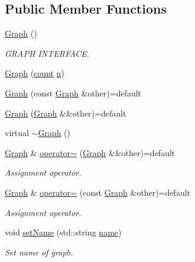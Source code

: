 \subsection*{Public Member Functions}
\begin{DoxyCompactItemize}
\item 
\hyperlink{class_networ_kit_1_1_graph_a87de501cbe5b2d6035a243e21dd6206f}{Graph} ()
\begin{DoxyCompactList}\small\item\em G\-R\-A\-P\-H I\-N\-T\-E\-R\-F\-A\-C\-E. \end{DoxyCompactList}\item 
\hyperlink{class_networ_kit_1_1_graph_aba688511045b476df066431fd797333b}{Graph} (\hyperlink{namespace_networ_kit_a76b399edfa50ae72e4aa86007aaa800a}{count} \hyperlink{class_networ_kit_1_1_graph_aae05e611d6d5eb42e045d374d73eb34a}{n})
\item 
\hyperlink{class_networ_kit_1_1_graph_a546fce4f46696bafda972708740d7c23}{Graph} (const \hyperlink{class_networ_kit_1_1_graph}{Graph} \&other)=default
\item 
\hyperlink{class_networ_kit_1_1_graph_aa6439b109da43c59f73004b95455cb98}{Graph} (\hyperlink{class_networ_kit_1_1_graph}{Graph} \&\&other)=default
\item 
virtual \hyperlink{class_networ_kit_1_1_graph_a95159535740c13622832bd95cf04e553}{$\sim$\-Graph} ()
\item 
\hyperlink{class_networ_kit_1_1_graph}{Graph} \& \hyperlink{class_networ_kit_1_1_graph_a9fba2502fc2fddfabc764ff9e6571956}{operator=} (\hyperlink{class_networ_kit_1_1_graph}{Graph} \&\&other)=default
\begin{DoxyCompactList}\small\item\em Assignment operator. \end{DoxyCompactList}\item 
\hyperlink{class_networ_kit_1_1_graph}{Graph} \& \hyperlink{class_networ_kit_1_1_graph_af3c20702345d511a0e84ffbdfb314b6a}{operator=} (const \hyperlink{class_networ_kit_1_1_graph}{Graph} \&other)=default
\begin{DoxyCompactList}\small\item\em Assignment operator. \end{DoxyCompactList}\item 
void \hyperlink{class_networ_kit_1_1_graph_ac40cbd88c3a2b65d33ce74236b805666}{set\-Name} (std\-::string \hyperlink{class_networ_kit_1_1_graph_aad1c9901bb8b7493df628469be54300a}{name})
\begin{DoxyCompactList}\small\item\em Set name of graph. \end{DoxyCompactList}\item 

\end{DoxyCompactItemize}
